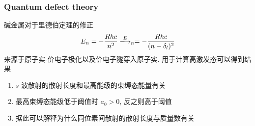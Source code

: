 \documentclass[10pt,a4paper,twocolumn]{article} %
\numberwithin{equation}{section} %
\begin{document}
\subsubsection{Quantum defect theory} %
\label{ssub:quantum_defect_theory}
碱金属对于里德伯定理的修正
\begin{equation}
	E_n = -\frac{Rhc}{n^2} \xlongrightarrow E_n = -\frac{Rhc}{(n-\delta_l)^2}
\end{equation}
来源于原子实-价电子极化以及价电子隧穿入原子实. 用于计算高激发态可以得到结果
\begin{enumerate}
	\item $s$ 波散射的散射长度和最高能级的束缚态能量有关
	\item 最高束缚态能级低于阈值时 $a_0>0$, 反之则高于阈值
	\item 据此可以解释为什么同位素间散射的散射长度与质量数有关
\end{enumerate}
\end{document}

